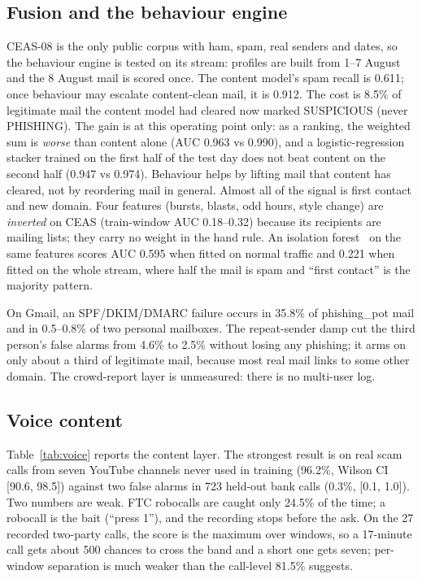 \documentclass[conference]{IEEEtran}
\begin{document}
\subsection{Fusion and the behaviour engine}
CEAS-08 is the only public corpus with ham, spam, real senders and dates, so
the behaviour engine is tested on its stream: profiles are built from 1--7
August and the 8 August mail is scored once. The content model's spam recall
is 0.611; once behaviour may escalate content-clean mail, it is 0.912. The cost
is 8.5\% of legitimate mail the content model had cleared now marked
SUSPICIOUS (never PHISHING). The gain is at this operating point only: as a
ranking, the weighted sum is \emph{worse} than content alone (AUC 0.963 vs
0.990), and a logistic-regression stacker trained on the first half of the test
day does not beat content on the second half (0.947 vs 0.974). Behaviour helps by
lifting mail that content has cleared, not by reordering mail in general. Almost all of the signal is first contact and new
domain. Four features (bursts, blasts, odd hours, style change) are
\emph{inverted} on CEAS (train-window AUC 0.18--0.32) because its recipients are
mailing lists; they carry no weight in the hand rule. An isolation
forest~\cite{lestari2025isolation} on the same features scores AUC 0.595 when
fitted on normal traffic and 0.221 when fitted on the whole stream, where half the
mail is spam and ``first contact'' is the majority pattern.

On Gmail, an SPF/DKIM/DMARC failure occurs in 35.8\% of phishing\_pot mail and
in 0.5--0.8\% of two personal mailboxes. The repeat-sender damp cut the third
person's false alarms from 4.6\% to 2.5\% without losing any phishing; it arms
on only about a third of legitimate mail, because most real mail links to some
other domain. The crowd-report layer is unmeasured: there is no multi-user log.

\subsection{Voice content}
Table~\ref{tab:voice} reports the content layer. The strongest result is on
real scam calls from seven YouTube channels never used in training (96.2\%,
Wilson CI [90.6, 98.5]) against two false alarms in 723 held-out bank calls
(0.3\%, [0.1, 1.0]). Two numbers are weak. FTC robocalls are caught only
24.5\% of the time; a robocall is the bait (``press 1''), and the
recording stops before the ask. On the 27 recorded two-party calls, the score is
the maximum over windows, so a 17-minute call gets about 500 chances to cross the
band and a short one gets seven; per-window separation is much weaker than the
call-level 81.5\% suggests.
\end{document}
